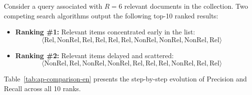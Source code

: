 \begin{example}
Consider a query associated with $R = 6$ relevant documents in the collection. Two competing search algorithms output the following top-10 ranked results:
\begin{itemize}
    \item \textbf{Ranking \#1:} Relevant items concentrated early in the list:
    \[
    \langle \text{Rel}, \text{NonRel}, \text{Rel}, \text{Rel}, \text{Rel}, \text{Rel}, \text{NonRel}, \text{NonRel}, \text{NonRel}, \text{Rel} \rangle
    \]
    \item \textbf{Ranking \#2:} Relevant items delayed and scattered:
    \[
    \langle \text{NonRel}, \text{Rel}, \text{NonRel}, \text{NonRel}, \text{Rel}, \text{Rel}, \text{Rel}, \text{NonRel}, \text{Rel}, \text{Rel} \rangle
    \]
\end{itemize}
Table~\ref{tab:ap-comparison-en} presents the step-by-step evolution of Precision and Recall across all 10 ranks.

\begin{table}[htbp]
\centering
{}
\caption{Detailed comparative evaluation of Average Precision between Ranking \#1 and Ranking \#2.}
\label{tab:ap-comparison-en}
\end{table}


\end{example}

